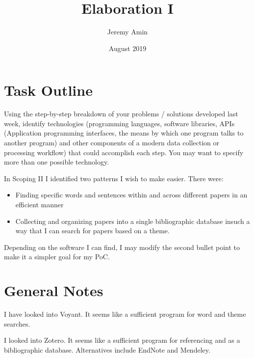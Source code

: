 \documentclass{article}
\title{Elaboration I}
\author{Jeremy Amin}
\date{August 2019}
\begin{document}
\maketitle

\tableofcontents

\section{Task Outline}
Using the step-by-step breakdown of your problems / solutions developed last week, identify technologies (programming languages, software libraries, APIs (Application programming interfaces, the means by which one program talks to another program) and other components of a modern data collection or processing workflow) that could accomplish each step. You may want to specify more than one possible technology. 


\noindent
In Scoping II I identified two patterns I wish to make easier. There were:

\begin{itemize}
    \item Finding specific words and sentences within and across different papers in an efficient manner
    \item Collecting and organizing papers into a single bibliographic database insuch a way that I can search for papers based on a theme.

\end{itemize}

\noindent
Depending on the software I can find, I may modify the second bullet point to make it a simpler goal for my PoC.


\section{General Notes}

I have looked into Voyant. It seems like a sufficient program for word and theme searches. 

I looked into Zotero. It seems like a sufficient program for referencing and as a bibliographic database. Alternatives include EndNote and Mendeley.
\end{document}
